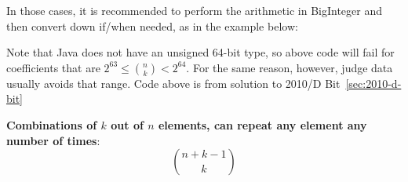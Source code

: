 In those cases, it is recommended to perform the arithmetic in BigInteger and then convert
down if/when needed, as in the example below:


Note that Java does not have an unsigned 64-bit type, so above code will fail for 
coefficients that are $2^{63} \leq \binom{n}{k} < 2^{64}$.  
For the same reason, however, judge data usually avoids that range.
Code above is from solution to 2010/D Bit~\ref{sec:2010-d-bit}

\textbf{Combinations of $k$ out of $n$ elements, can repeat any element any number of times}:
\[
    \binom{n + k - 1}{k}
\]

